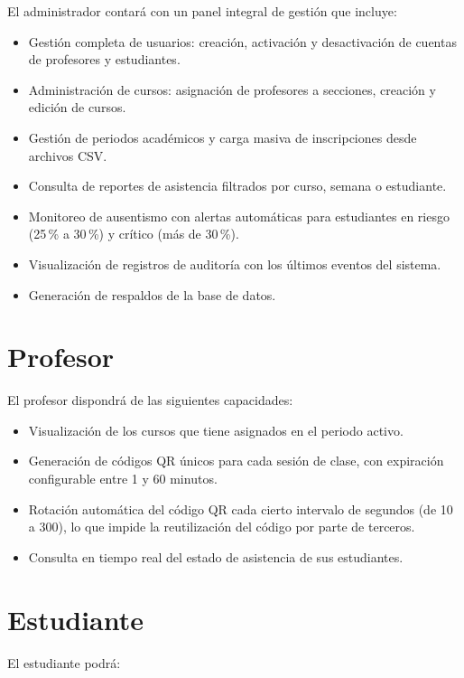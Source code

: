 \documentclass[12pt, letterpaper, oneside]{report}
\begin{document}
El administrador contar\'a con un panel integral de gesti\'on que incluye:

\begin{itemize}
  \item Gesti\'on completa de usuarios: creaci\'on, activaci\'on y desactivaci\'on de cuentas de profesores y estudiantes.
  \item Administraci\'on de cursos: asignaci\'on de profesores a secciones, creaci\'on y edici\'on de cursos.
  \item Gesti\'on de periodos acad\'emicos y carga masiva de inscripciones desde archivos CSV.
  \item Consulta de reportes de asistencia filtrados por curso, semana o estudiante.
  \item Monitoreo de ausentismo con alertas autom\'aticas para estudiantes en riesgo (25\,\% a 30\,\%) y cr\'itico (m\'as de 30\,\%).
  \item Visualizaci\'on de registros de auditor\'ia con los \'ultimos eventos del sistema.
  \item Generaci\'on de respaldos de la base de datos.
\end{itemize}

\section{Profesor}

El profesor dispondr\'a de las siguientes capacidades:

\begin{itemize}
  \item Visualizaci\'on de los cursos que tiene asignados en el periodo activo.
  \item Generaci\'on de c\'odigos QR \'unicos para cada sesi\'on de clase, con expiraci\'on configurable entre 1 y 60 minutos.
  \item Rotaci\'on autom\'atica del c\'odigo QR cada cierto intervalo de segundos (de 10 a 300), lo que impide la reutilizaci\'on del c\'odigo por parte de terceros.
  \item Consulta en tiempo real del estado de asistencia de sus estudiantes.
\end{itemize}

\section{Estudiante}

El estudiante podr\'a:
\end{document}
